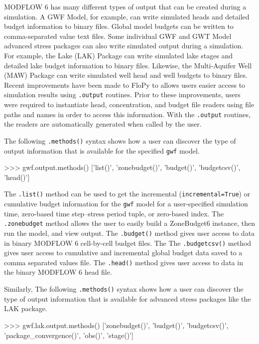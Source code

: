 \documentclass[11pt, oneside]{article}  	%
\begin{document}
MODFLOW 6 has many different types of output that can be created during a simulation. A GWF Model, for example, can write simulated heads and detailed budget information to binary files. Global model budgets can be written to comma-separated value text files. Some individual GWF and GWT Model advanced stress packages can also write simulated output during a simulation. For example, the Lake (LAK) Package can write simulated lake stages and detailed lake budget information to binary files. Likewise, the Multi-Aquifer Well (MAW) Package can write simulated well head and well budgets to binary files. Recent improvements have been made to FloPy to allows users easier access to simulation results using \texttt{.output} routines. Prior to these improvements, users were required to instantiate head, concentration, and budget file readers using file paths and names in order to access this information. With the \texttt{.output} routines, the readers are automatically generated when called by the user.

The following \texttt{.methods()} syntax shows how a user can discover the type of output information that is available for the specified \texttt{gwf} model.

\begin{python}
>>> gwf.output.methods()
['list()', 'zonebudget()', 'budget()', 'budgetcsv()', 'head()']
\end{python}

\noindent The \texttt{.list()} method can be used to get the incremental (\texttt{incremental=True}) or cumulative budget information for the \texttt{gwf} model for a user-specified simulation time, zero-based time step--stress period tuple, or zero-based index. The \texttt{.zonebudget{}} method allows the user to easily build a ZoneBudget6 instance, then run the model, and view output. The \texttt{.budget()} method gives user access to data in binary MODFLOW 6 cell-by-cell budget files. The The \texttt{.budgetcsv()} method gives user access to cumulative and incremental global budget data saved to a comma separated values file. The \texttt{.head()} method gives user access to data in the binary MODFLOW 6 head file.

Similarly, The following \texttt{.methods()} syntax shows how a user can discover the type of output information that is available for advanced stress packages like the LAK package.

\begin{python}
>>> gwf.lak.output.methods()
['zonebudget()', 'budget()', 'budgetcsv()', 'package_convergence()', 'obs()',  'stage()']
\end{python}
\end{document}
